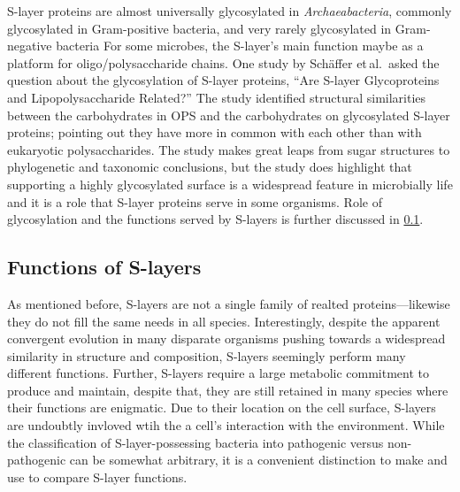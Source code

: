 \ac{S-layer} proteins are almost universally glycosylated in \textit{Archaeabacteria}, commonly
glycosylated in Gram-positive bacteria, and very rarely glycosylated in Gram-negative
bacteria
For some microbes, the \ac{S-layer}'s main function maybe as a platform for oligo/polysaccharide chains. One study by Sch\"{a}ffer et\,al.~asked the question about the glycosylation of \ac{S-layer} proteins, ``Are \ac{S-layer} Glycoproteins and Lipopolysaccharide Related?'' The study identified structural similarities between the carbohydrates in \ac{OPS} and the carbohydrates on glycosylated \ac{S-layer} proteins; pointing out they have more in common with each other than with eukaryotic polysaccharides. The study makes great leaps from sugar structures to phylogenetic and taxonomic conclusions, but the study does highlight that supporting a highly glycosylated surface is a widespread feature in microbially life and it is a role that \ac{S-layer} proteins serve in some organisms. Role of glycosylation and the functions served by \acp{S-layer} is further discussed in \cref{sec:intro-slayersfunction}.

  \subsection{Functions of S-layers}
  \label{sec:intro-slayersfunction}

  As mentioned before, \acp{S-layer} are not a single family of realted proteins---likewise they do not fill the same needs in all species. Interestingly, despite the apparent convergent evolution in many disparate organisms pushing towards a widespread similarity in structure and composition, \acp{S-layer} seemingly perform many  different functions. Further, \acp{S-layer} require a large metabolic commitment to produce and maintain, despite that, they are still retained in many species where their functions are enigmatic. Due to their location on the cell surface, \acp{S-layer} are undoubtly invloved wtih the a cell's interaction with the environment. While the classification of \ac{S-layer}-possessing bacteria into pathogenic versus non-pathogenic can be somewhat arbitrary, it is a convenient distinction to make and use to compare \ac{S-layer} functions. 
  
